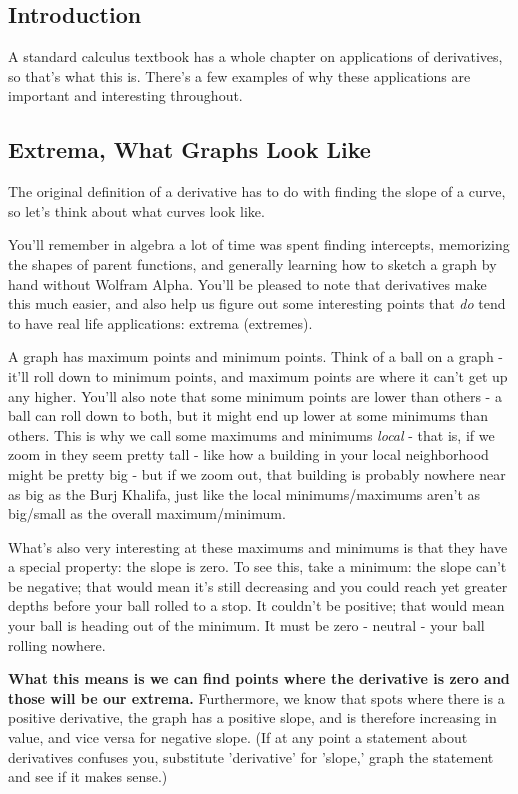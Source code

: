 \subsection{Introduction}

A standard calculus textbook has a whole chapter on applications of derivatives, so that's what this is. There's a few examples of why these applications are important and interesting throughout.

\subsection{Extrema, What Graphs Look Like}

The original definition of a derivative has to do with finding the slope of a curve, so let's think about what curves look like.

You'll remember in algebra a lot of time was spent finding intercepts, memorizing the shapes of parent functions, and generally learning how to sketch a graph by hand without Wolfram Alpha. You'll be pleased to note that derivatives make this much easier, and also help us figure out some interesting points that \textit{do} tend to have real life applications: extrema (extremes).

A graph has maximum points and minimum points. Think of a ball on a graph - it'll roll down to minimum points, and maximum points are where it can't get up any higher. You'll also note that some minimum points are lower than others - a ball can roll down to both, but it might end up lower at some minimums than others. This is why we call some maximums and minimums \textit{local} - that is, if we zoom in they seem pretty tall - like how a building in your local neighborhood might be pretty big - but if we zoom out, that building is probably nowhere near as big as the Burj Khalifa, just like the local minimums/maximums aren't as big/small as the overall maximum/minimum.

What's also very interesting at these maximums and minimums is that they have a special property: the slope is zero. To see this, take a minimum: the slope can't be negative; that would mean it's still decreasing and you could reach yet greater depths before your ball rolled to a stop. It couldn't be positive; that would mean your ball is heading out of the minimum. It must be zero - neutral - your ball rolling nowhere.

\textbf{What this means is we can find points where the derivative is zero and those will be our extrema.} Furthermore, we know that spots where there is a positive derivative, the graph has a positive slope, and is therefore increasing in value, and vice versa for negative slope. (If at any point a statement about derivatives confuses you, substitute 'derivative' for 'slope,' graph the statement and see if it makes sense.)

